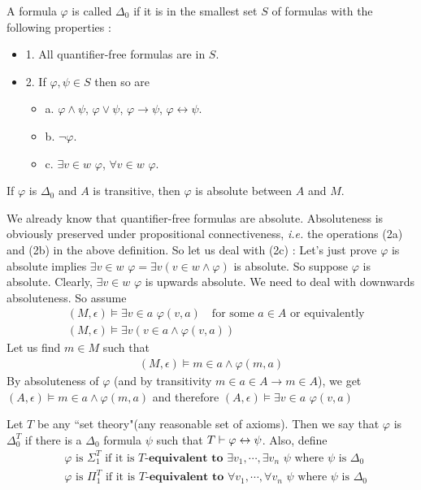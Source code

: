 \documentclass[12pt,a4paper]{article}
\newenvironment{proof}
{\begin{changemargin}{0.5cm}{0.5cm} 
	}%
	{\end{changemargin}
}
\renewenvironment{i}
{\begin{itemize} 
	}%
	{\end{itemize}
}
\newenvironment{p}
{\begin{proof} 
	}%
	{\end{proof}
}
\begin{document}
 A formula $\varphi$ is called $\Delta_0$ if it is in the smallest set $S$ of formulas with the following properties :
\begin{i}
\item[1.] All quantifier-free formulas are in $S$.
\item[2.] If $\varphi, \psi \in S$ then so are
\begin{i}
\item[a.] $\varphi \wedge \psi$, $\varphi \vee \psi$, $\varphi \rightarrow \psi$, $\varphi \leftrightarrow \psi$.
\item[b.] $\neg \varphi$.
\item[c.] $\exists v\in w\,\, \varphi$, $\forall v\in w\,\, \varphi$.
\end{i}
\end{i}
\s

\thm If $\varphi$ is $\Delta_0$ and $A$ is transitive, then $\varphi$ is absolute between $A$ and $M$.
\begin{p}
\pf We already know that quantifier-free formulas are absolute. Absoluteness is obviously preserved under propositional connectiveness, \textit{i.e.} the operations (2a) and (2b) in the above definition. So let us deal with (2c) : Let's just prove $\varphi$ is absolute implies $\exists v\in w \,\, \varphi = \exists v(v\in w\wedge \varphi)$ is absolute. So suppose $\varphi$ is absolute. Clearly, $\exists v\in w\,\,\varphi$ is upwards absolute. We need to deal with downwards absoluteness. So assume
\begin{align*}
&(M, \epsilon) \models \exists v\in a \,\, \varphi(v,a) \quad \text{for some } a\in A \text{ or equivalently} \\
&(M, \epsilon) \models \exists v(v\in a \wedge \varphi(v,a))
\end{align*}
Let us find $m\in M$ such that
\begin{align*}
(M, \epsilon) \models m\in a \wedge \varphi(m,a) 
\end{align*}
By absoluteness of $\varphi$ (and by transitivity $m\in a\in A \rightarrow m\in A$), we get $(A, \epsilon) \models m\in a \wedge \varphi(m,a)$ and therefore $(A, \epsilon) \models \exists v\in a\,\, \varphi(v,a)$

\eop
\end{p}
\s

 Let $T$ be any ``set theory"(any reasonable set of axioms). Then we say that $\varphi$ is $\Delta_0^T$ if there is a $\Delta_0$ formula $\psi$ such that $T \vdash \varphi \leftrightarrow \psi$. Also, define
\begin{align*}
&\varphi \text{ is } \Sigma_1^T \text{ if it is } T \textbf{-equivalent to } \exists v_1, \cdots, \exists v_n \,\,\psi \text{ where } \psi \text{ is } \Delta_0 \\
&\varphi \text{ is } \Pi_1^T \text{ if it is } T \textbf{-equivalent to } \forall v_1, \cdots, \forall v_n \,\,\psi \text{ where } \psi \text{ is } \Delta_0
\end{align*}
\s
\end{document}
